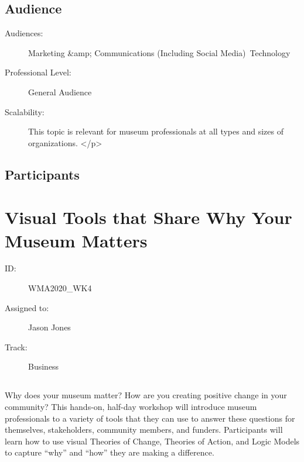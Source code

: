 \documentclass{report}
\begin{document}
              \subsection*{Audience}
                \begin{description}
                  \item [Audiences:]Marketing &amp; Communications (Including Social Media)~Technology~
                  \item[Professional Level:]General Audience~
                \item[Scalability:] This topic is relevant for museum professionals at all types and sizes of organizations.
</p>
							
              \end{description}
            \subsection*{Participants}
              





    
  
        
          \newpage
          \section{ Visual Tools that Share Why Your Museum Matters  }
            \begin{description}
              \item [ID:]
              WMA2020\_WK4

              \item [Assigned to:]Jason Jones~
                \item [Track:]Business~
              \end{description}
              \subsection*{}
                Why does your museum matter? How are you creating positive change in your community? This hands-on, half-day workshop will introduce museum professionals to a variety of tools that they can use to answer these questions for themselves, stakeholders, community members, and funders. Participants will learn how to use visual Theories of Change, Theories of Action, and Logic Models to capture “why” and “how” they are making a difference.
\end{document}
